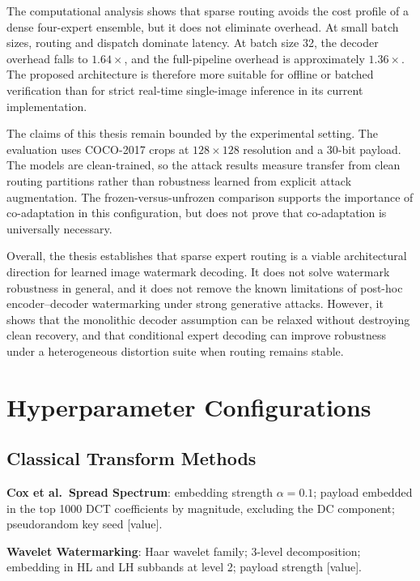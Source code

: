 ﻿\documentclass[12pt, a4paper, twoside]{report}
\numberwithin{equation}{chapter}
\begin{document}
The computational analysis shows that sparse routing avoids the cost profile of a dense four-expert ensemble, but it does not eliminate overhead. At small batch sizes, routing and dispatch dominate latency. At batch size 32, the decoder overhead falls to $1.64\times$, and the full-pipeline overhead is approximately $1.36\times$. The proposed architecture is therefore more suitable for offline or batched verification than for strict real-time single-image inference in its current implementation.

The claims of this thesis remain bounded by the experimental setting. The evaluation uses COCO-2017 crops at $128\times128$ resolution and a 30-bit payload. The models are clean-trained, so the attack results measure transfer from clean routing partitions rather than robustness learned from explicit attack augmentation. The frozen-versus-unfrozen comparison supports the importance of co-adaptation in this configuration, but does not prove that co-adaptation is universally necessary.

Overall, the thesis establishes that sparse expert routing is a viable architectural direction for learned image watermark decoding. It does not solve watermark robustness in general, and it does not remove the known limitations of post-hoc encoder--decoder watermarking under strong generative attacks. However, it shows that the monolithic decoder assumption can be relaxed without destroying clean recovery, and that conditional expert decoding can improve robustness under a heterogeneous distortion suite when routing remains stable.



\appendix

\chapter{Hyperparameter Configurations}

\section{Classical Transform Methods}

\textbf{Cox et al.\ Spread Spectrum}: embedding strength $\alpha = 0.1$; payload embedded in the top 1000 DCT coefficients by magnitude, excluding the DC component; pseudorandom key seed [value].

\textbf{Wavelet Watermarking}: Haar wavelet family; 3-level decomposition; embedding in HL and LH subbands at level 2; payload strength [value].
\end{document}
